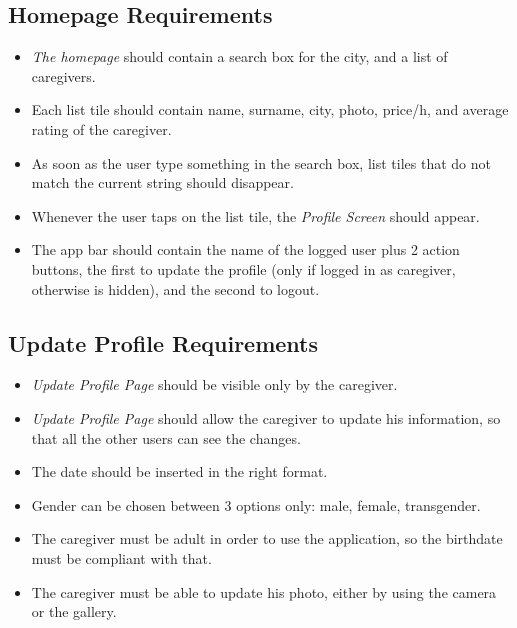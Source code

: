 \documentclass[../../dd.tex]{subfiles}
\begin{document}
    \subsection{Homepage Requirements}
    \begin{itemize}
        \item \textit{The homepage} should contain a search box for the city, and a list of caregivers.
        \item Each list tile should contain name, surname, city, photo, price/h, and average rating of the caregiver.
        \item As soon as the user type something in the search box, list tiles that do not match the current string should disappear.
        \item Whenever the user taps on the list tile, the \textit{Profile Screen} should appear.
        \item The app bar should contain the name of the logged user plus 2 action buttons, the first to update the profile
        (only if logged in as caregiver, otherwise is hidden), and the second to logout.
    \end{itemize}

    \subsection{Update Profile Requirements}
    \begin{itemize}
        \item \textit{Update Profile Page} should be visible only by the caregiver.
        \item \textit{Update Profile Page} should allow the caregiver to update his information, so that all the other users can see the changes.
        \item The date should be inserted in the right format.
        \item Gender can be chosen between 3 options only: male, female, transgender.
        \item The caregiver must be adult in order to use the application, so the birthdate must be compliant with that.
        \item The caregiver must be able to update his photo, either by using the camera or the gallery.
    \end{itemize}
\end{document}
